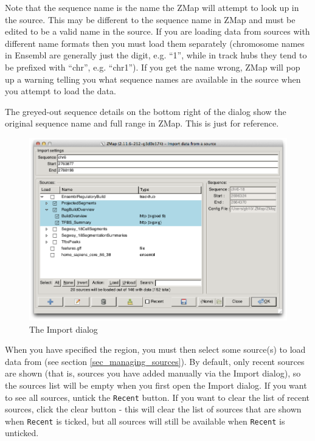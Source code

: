 \documentclass[letterpaper]{article}
\begin{document}
Note that the sequence name is the name the ZMap will attempt to look up in the source. This may be different to the sequence name in ZMap and must be edited to be a valid name in the source. If you are loading data from sources with different name formats then you must load them separately (chromosome names in Ensembl are generally just the digit, e.g. ``1'', while in track hubs they tend to be prefixed with ``chr'', e.g. ``chr1''). If you get the name wrong, ZMap will pop up a warning telling you what sequence names are available in the source when you attempt to load the data.

The greyed-out sequence details on the bottom right of the dialog show the original sequence name and full range in ZMap. This is just for reference.

\begin{figure}
\centering
\color[rgb]{0.30980393,0.5058824,0.7411765}
\includegraphics[width=15.231cm]{images/import.png}
\caption{The Import dialog}
\label{img_import}
\end{figure}

When you have specified the region, you must then select some source(s) to load data from (see section \ref{sec_managing_sources}). By default, only recent sources are shown (that is, sources you have added manually via the Import dialog), so the sources list will be empty when you first open the Import dialog. If you want to see all sources, untick the \lstinline{Recent} button. If you want to clear the list of recent sources, click the clear button - this will clear the list of sources that are shown when \lstinline{Recent} is ticked, but all sources will still be available when \lstinline{Recent} is unticked.
\end{document}
